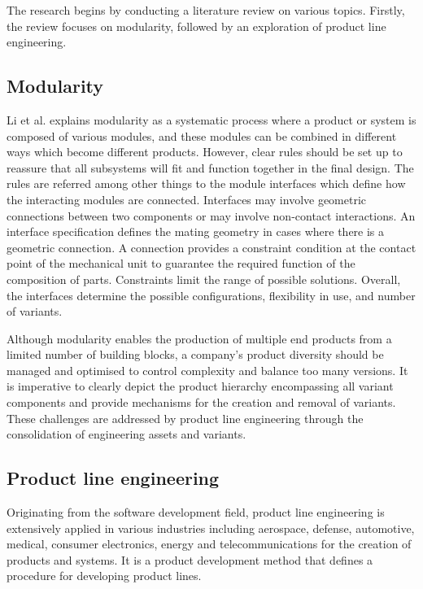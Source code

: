 \documentclass[sigconf,review]{acmart}
\begin{document}
The research begins by conducting a literature review on various topics. 
Firstly, the review focuses on modularity, followed by an exploration of product line engineering.

\subsection{Modularity}
\label{sec:modualarity}

Li et al. explains modularity as a systematic process where a product or system is composed of various modules, and these modules can be combined in different ways which become different products. 
However, clear rules should be set up to reassure that all subsystems will fit and function together in the final design.
The rules are referred among other things to the module interfaces which define how the interacting modules are connected.
Interfaces may involve geometric connections between two components or may involve non-contact interactions. An interface specification defines the mating geometry in cases where there is a geometric connection.
A connection provides a constraint condition at the contact point of the mechanical unit to guarantee the required function of the composition of parts.
Constraints limit the range of possible solutions.
Overall, the interfaces determine the possible configurations, flexibility in use, and number of variants. 

Although modularity enables the production of  multiple end products from a limited number of building blocks, a company's product diversity should be managed and optimised to control complexity and balance too many versions. 
It is imperative to clearly depict the product hierarchy encompassing all variant components and provide mechanisms for the creation and removal of variants. 
These challenges are addressed by product line engineering through the consolidation of engineering assets and variants.
\subsection{Product line engineering}
\label{sec:product line engineering}

Originating from the software development field, product line engineering is extensively applied in various industries including aerospace, defense, automotive, medical, consumer electronics, energy and telecommunications for the creation of products and systems. 
It is a product development method that defines a procedure for developing product lines. 
\end{document}
